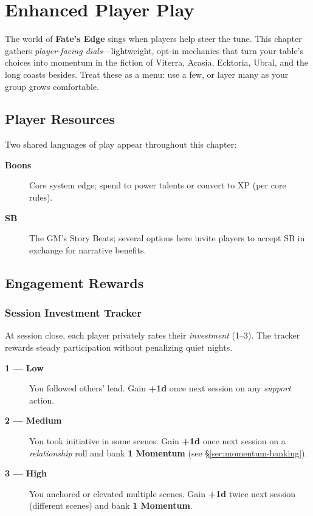 
\chapter{Enhanced Player Play}
\label{ch:enhanced-play}

\begin{multicols}{2}

The world of \textbf{Fate’s Edge} sings when players help steer the tune. This chapter gathers \emph{player-facing dials}—lightweight, opt-in mechanics that turn your table’s choices into momentum in the fiction of Viterra, Acasia, Ecktoria, Ubral, and the long coasts besides. Treat these as a menu: use a few, or layer many as your group grows comfortable.

\section{Player Resources}

Two shared languages of play appear throughout this chapter:
\begin{description}
  \item[\textbf{Boons}] Core system edge; spend to power talents or convert to XP (per core rules).
  \item[\textbf{SB}] The GM’s Story Beats; several options here invite players to accept SB in exchange for narrative benefits.
\end{description}

\section{Engagement Rewards}

\subsection{Session Investment Tracker}
At session close, each player privately rates their \emph{investment} (1–3). The tracker rewards steady participation without penalizing quiet nights.

\begin{description}
  \item[\textbf{1 — Low}] You followed others’ lead. Gain \textbf{+1d} once next session on any \emph{support} action.
  \item[\textbf{2 — Medium}] You took initiative in some scenes. Gain \textbf{+1d} once next session on a \emph{relationship} roll and bank \textbf{1 Momentum} (see \S\ref{sec:momentum-banking}).%
  \item[\textbf{3 — High}] You anchored or elevated multiple scenes. Gain \textbf{+1d} twice next session (different scenes) and bank \textbf{1 Momentum}.%
\end{description}


\end{multicols}
